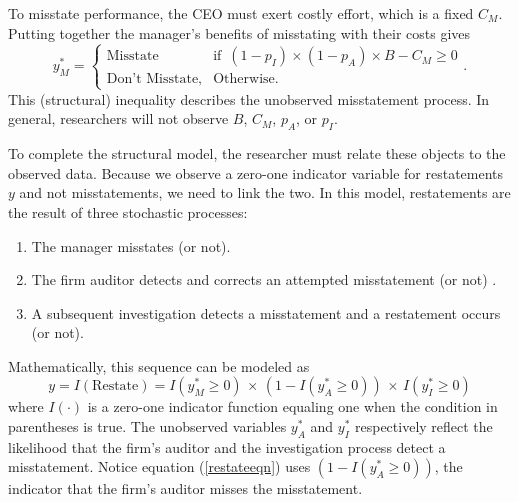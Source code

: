 To misstate performance, the CEO must exert costly effort, which is a fixed $C_M$. 
Putting together the manager's benefits of misstating with their costs gives
\begin{equation}\label{bencost}
		y_M^* = 
		  \begin{cases}
				\mbox{Misstate} & \mbox{if }\, (1-p_I) \times (1-p_A) \times B - C_M \ge 0\\
				\mbox{Don't Misstate,} & \mbox{Otherwise}.
		  \end{cases}.
\end{equation}
This (structural) inequality describes the unobserved misstatement process. 
In general, researchers will not observe $B$, $C_M$, $p_A$, or $p_I$.

To complete the structural model, the researcher must relate these objects to the observed data.
Because we observe a zero-one indicator variable for restatements $y$ and not misstatements, we need to link the two. 
In this model, restatements are the result of three stochastic processes:

\begin{enumerate}
\item The manager misstates (or not).
\item The firm auditor detects and corrects an attempted misstatement (or not) .
\item A subsequent investigation detects a misstatement and a restatement occurs (or not).
\end{enumerate}

Mathematically, this sequence can be modeled as
\begin{equation}\label{restateeqn}
 y = I(\mbox{Restate}) = I(y^*_M \ge 0) \, \times\, (1 - I(y^*_A \ge 0)) \, \times\, I(y^*_I \ge 0)
\end{equation}
where $I(\cdot)$ is a zero-one indicator function equaling one when the condition in parentheses is true.
The unobserved variables $y^*_A$ and $y^*_I$ respectively reflect the likelihood that the firm's
auditor and the investigation process detect a misstatement. Notice equation (\ref{restateeqn})
uses $(1 - I(y^*_A \ge 0))$, the indicator that the firm's auditor misses the misstatement.

